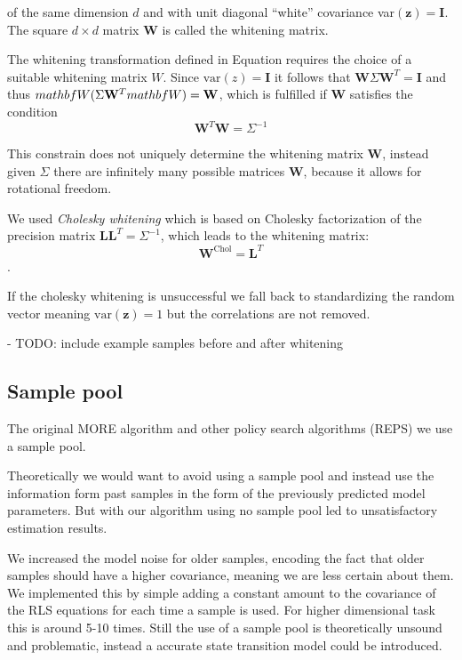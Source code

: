 of the same dimension $d$ and with unit diagonal ``white'' covariance
var$(\mathbf{z}) = \mathbf{I}$. The square $d \times d$
matrix $\mathbf{W}$ is called the whitening matrix.

The whitening transformation defined in Equation  requires
the choice of a suitable whitening matrix $W$.
Since $\text{var}(z) = \mathbf{I}$ it follows that
$\mathbf{W}\Sigma \mathbf{W}^T = \mathbf{I}$ and thus
$\\mathbf{W}(\Sigma \mathbf{W}^T\\mathbf{W}) = \mathbf{W}$, which
is fulfilled if $\mathbf{W}$ satisfies the condition
$$ \mathbf{W}^T \mathbf{W} = \Sigma^{-1} $$

This constrain does not uniquely determine the whitening
matrix $\mathbf{W}$, instead given $\Sigma$ there are infinitely many
possible matrices $\mathbf{W}$, because it allows for rotational freedom.

We used \textit{Cholesky whitening} which is based on
Cholesky factorization of the precision matrix
$\mathbf{L}\mathbf{L}^T = \Sigma^{-1}$, which leads to the whitening
matrix:
$$ \mathbf{W}^{\text{Chol}} = \mathbf{L}^T $$.

If the cholesky whitening is unsuccessful we fall back to standardizing
the random vector meaning $\text{var}(\mathbf{z}) = 1$ but the correlations
are not removed.

- TODO: include example samples before and after whitening

\subsection{Sample pool}
The original MORE algorithm and other policy search algorithms (REPS) we
use a sample pool.

Theoretically  we would want to avoid using a sample pool and instead use
the information form past samples in the form of the previously predicted
model parameters. But with our algorithm using no sample pool led
to unsatisfactory estimation results.

We increased the model noise for older samples, encoding the fact that
older samples should have a higher covariance, meaning we are less
certain about them. We implemented this by simple adding a constant
amount to the covariance of the RLS equations for each time a sample is
used. For higher dimensional task this is around 5-10 times.
Still the use of a sample pool is theoretically unsound and problematic,
instead a accurate state transition model could be introduced.

